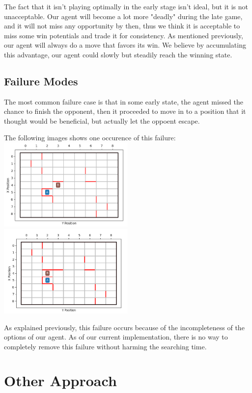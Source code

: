 \documentclass[twoside,11pt]{article}
\begin{document}
The fact that it isn't playing optimally in the early stage isn't ideal, but it is not unacceptable.
Our agent will become a lot more "deadly" during the late game, and it will not miss any opportunity by then, thus we think it is acceptable to miss some win potentials and trade it for consistency. 
As mentioned previously, our agent will always do a move that favors its win.
We believe by accumulating this advantage, our agent could slowly but steadily reach the winning state.

\subsection{Failure Modes}
The most common failure case is that in some early state, the agent missed the chance to finish the opponent, then it proceeded to move in to a position that it thought would be beneficial, but actually let the oppoent escape.

The following images shows one occurence of this failure:\\
\includegraphics[width=0.5\textwidth]{images/b_skip_1.png}
\includegraphics[width=0.5\textwidth]{images/b_skip_2.png}

As explained previously, this failure occurs because of the incompleteness of the options of our agent.
As of our current implementation, there is no way to completely remove this failure without harming the searching time.

\section{Other Approach}
\end{document}
